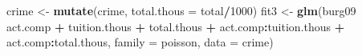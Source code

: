 \documentclass[
]{krantz}
\newenvironment{Shaded}{\begin{snugshade}}{\end{snugshade}}
\newcommand{\DataTypeTok}[1]{\textcolor[rgb]{0.27,0.27,0.27}{#1}}
\newcommand{\DecValTok}[1]{\textcolor[rgb]{0.06,0.06,0.06}{#1}}
\newcommand{\KeywordTok}[1]{\textcolor[rgb]{0.27,0.27,0.27}{\textbf{#1}}}
\newcommand{\NormalTok}[1]{#1}
\newcommand{\OperatorTok}[1]{\textcolor[rgb]{0.43,0.43,0.43}{\textbf{#1}}}
\newcommand{\StringTok}[1]{\textcolor[rgb]{0.5,0.5,0.5}{#1}}
\begin{document}
\begin{Shaded}
\begin{Highlighting}[]
\NormalTok{crime <-}\StringTok{ }\KeywordTok{mutate}\NormalTok{(crime, }\DataTypeTok{total.thous =}\NormalTok{ total}\OperatorTok{/}\DecValTok{1000}\NormalTok{)}
\NormalTok{fit3 <-}\StringTok{ }\KeywordTok{glm}\NormalTok{(burg09 }\OperatorTok{~}\StringTok{ }\NormalTok{act.comp }\OperatorTok{+}\StringTok{ }\NormalTok{tuition.thous }\OperatorTok{+}\StringTok{ }
\StringTok{            }\NormalTok{total.thous }\OperatorTok{+}\StringTok{ }\NormalTok{act.comp}\OperatorTok{:}\NormalTok{tuition.thous }\OperatorTok{+}
\StringTok{            }\NormalTok{act.comp}\OperatorTok{:}\NormalTok{total.thous, }\DataTypeTok{family =}\NormalTok{ poisson, }
            \DataTypeTok{data =}\NormalTok{ crime)}
\end{Highlighting}
\end{Shaded}
\end{document}
